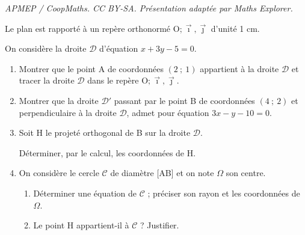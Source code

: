 \documentclass[10pt]{article}
\providecommand{\Oij}{\(\mathrm{O};\vec{\imath},\vec{\jmath}\)}
\begin{document}
\noindent\textit{APMEP / CoopMaths. CC BY-SA. Présentation adaptée par Maths Explorer.}\par\medskip
\bigskip

Le plan est rapporté à un repère orthonormé \Oij{} d'unité 1 cm.

On considère la droite $\mathcal D$ d'équation $x+3y-5=0$.

\medskip

\begin{enumerate}
\item Montrer que le point A de coordonnées $(2~;~1)$ appartient à la droite $\mathcal D$ et tracer la droite $\mathcal D$ dans le repère \Oij.
\item Montrer que la droite $\mathcal D'$ passant par le point B de coordonnées $(4~;~2)$ et perpendiculaire à la droite $\mathcal D$, admet pour équation $3x-y-10=0$.
\item Soit H le projeté orthogonal de B sur la droite $\mathcal D$.

Déterminer, par le calcul, les coordonnées de H.
\item On considère le cercle $\mathcal C$ de diamètre [AB] et on note $\Omega$ son centre.
	\begin{enumerate}
		\item Déterminer une équation de $\mathcal C$ ; préciser son rayon et les coordonnées de $\Omega$.
		\item Le point H appartient-il à $\mathcal C$ ? Justifier.
	\end{enumerate}
\end{enumerate}
\end{document}
